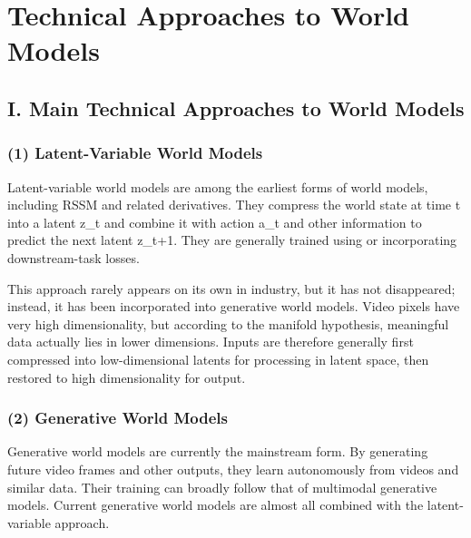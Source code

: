 \setcounter{section}{1}

\hypertarget{technical-approaches-to-world-models}{%
\section{Technical Approaches to World Models}\label{technical-approaches-to-world-models}}

\hypertarget{i.-main-technical-approaches-to-world-models}{%
\subsection{I. Main Technical Approaches to World Models}\label{i.-main-technical-approaches-to-world-models}}

\hypertarget{latent-variable-world-models}{%
\subsubsection{(1) Latent-Variable World Models}\label{latent-variable-world-models}}

Latent-variable world models are among the earliest forms of world models, including RSSM and related derivatives. They compress the world state at time t into a latent z\_t and combine it with action a\_t and other information to predict the next latent z\_t+1. They are generally trained using or incorporating downstream-task losses.

This approach rarely appears on its own in industry, but it has not disappeared; instead, it has been incorporated into generative world models. Video pixels have very high dimensionality, but according to the manifold hypothesis, meaningful data actually lies in lower dimensions. Inputs are therefore generally first compressed into low-dimensional latents for processing in latent space, then restored to high dimensionality for output.

\hypertarget{generative-world-models}{%
\subsubsection{(2) Generative World Models}\label{generative-world-models}}

Generative world models are currently the mainstream form. By generating future video frames and other outputs, they learn autonomously from videos and similar data. Their training can broadly follow that of multimodal generative models. Current generative world models are almost all combined with the latent-variable approach.

